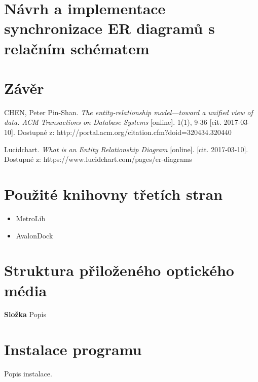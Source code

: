 \documentclass[czech,bachelor,public,dept460,male,oneside]{diploma}
\begin{document}
\newpage
\section{Návrh a implementace synchronizace ER diagramů s relačním schématem}

\newpage
\section{Závěr}

\newpage

\begin{thebibliography}{99}
	 CHEN, Peter Pin-Shan. \textit{The entity-relationship model---toward a unified view of data. ACM Transactions on Database Systems} [online]. 1(1), 9-36 [cit. 2017-03-10]. Dostupné z: http://portal.acm.org/citation.cfm?doid=320434.320440
	
	Lucidchart. \textit{What is an Entity Relationship Diagram} [online]. [cit. 2017-03-10]. Dostupné z: https://www.lucidchart.com/pages/er-diagrams
\end{thebibliography}


\appendix
\section{Použité knihovny třetích stran}
\begin{itemize}
	\item MetroLib
	\item AvalonDock
\end{itemize}

\section{Struktura přiloženého optického média}
\textbf{Složka} Popis

\section{Instalace programu}
Popis instalace.
\end{document}
